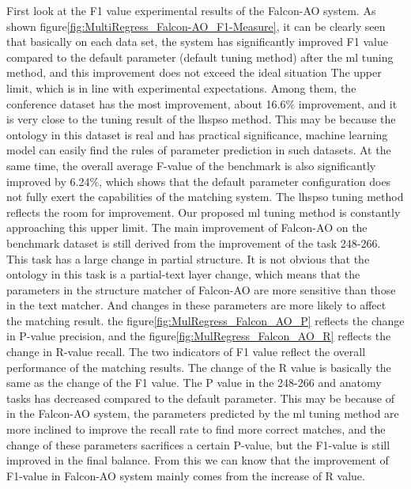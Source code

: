 \documentclass[twoside]{article}
\begin{document}
First look at the F1 value experimental results of the Falcon-AO system.
As shown figure\ref{fig:MultiRegress_Falcon-AO_F1-Measure}, it can be clearly seen that basically on each data set, the system has significantly improved F1 value compared to the default parameter (default tuning method) after the ml tuning method, and this improvement does not exceed the ideal situation The upper limit, which is in line with experimental expectations.
Among them, the conference dataset has the most improvement, about 16.6\% improvement, and it is very close to the tuning result of the lhspso method. This may be because the ontology in this dataset is real and has practical significance, machine learning model can easily find the rules of parameter prediction in such datasets.
At the same time, the overall average F-value of the benchmark is also significantly improved by 6.24\%, which shows that the default parameter configuration does not fully exert the capabilities of the matching system. The lhspso tuning method reflects the room for improvement. Our proposed ml tuning method is constantly approaching this upper limit.
The main improvement of Falcon-AO on the benchmark dataset is still derived from the improvement of the task 248-266. This task has a large change in partial structure. It is not obvious that the ontology in this task is a partial-text layer change, which means that the parameters in the structure matcher of Falcon-AO are more sensitive than those in the text matcher. And changes in these parameters are more likely to affect the matching result.
the figure\ref{fig:MulRegress_Falcon_AO_P} reflects the change in P-value precision, and the figure\ref{fig:MulRegress_Falcon_AO_R} reflects the change in R-value recall. The two indicators of F1 value reflect the overall performance of the matching results.
The change of the R value is basically the same as the change of the F1 value. The P value in the 248-266 and anatomy tasks has decreased compared to the default parameter. This may be because of in the Falcon-AO system, the parameters predicted by the ml tuning method are more inclined to improve the recall rate to find more correct matches, and the change of these parameters sacrifices a certain P-value, but the F1-value is still improved in the final balance. From this we can know that the improvement of F1-value in Falcon-AO system mainly comes from the increase of R value.
\end{document}
